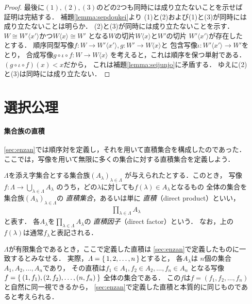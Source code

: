 \begin{proof}
    最後に$(1),(2),(3)$のどの2つも同時には成り立たないことを示せば証明は完結する．
    補題\ref{lemma:sepdoukei}より
    (1)と(2)および(1)と(3)が同時には成り立たないことは明らか．
    (2)と(3)が同時には成り立たないことを示す．
    $W \cong W' \langle x' \rangle$かつ$W \langle x \rangle \cong W'$
    となる$W$の切片$W \langle x \rangle$と$W'$の切片
    $W' \langle x' \rangle$が存在したとする．
    順序同型写像$f:W \longrightarrow W' \langle x' \rangle,
    g : W' \longrightarrow W \langle x \rangle$と
    包含写像$\iota : W' \langle x' \rangle \longrightarrow W'$をとり，
    合成写像$g \circ \iota \circ f : W \longrightarrow W \langle x \rangle$
    を考えると，これは順序を保つ単射である．
    $(g \circ \iota \circ f) (x) < x$だから，
    これは補題\ref{lemma:seijunjo}に矛盾する．
    ゆえに(2)と(3)は同時には成り立たない．
  \end{proof}

  \section{選択公理}

 \paragraph{集合族の直積}
  \ref{sec:enzan}では順序対を定義し，それを用いて直積集合を構成したのであった．
  ここでは，写像を用いて無限に多くの集合に対する直積集合を定義しよう．

  $\varLambda$を添え字集合とする集合族$(A_{\lambda})_{\lambda \in \varLambda}$
  が与えられたとする．このとき，
  写像$f: \varLambda \longrightarrow \bigcup_{\lambda \in \varLambda} A_{\lambda}$
  のうち，どの$\lambda$に対しても$f( \lambda ) \in A_{\lambda}$となるもの
  全体の集合を集合族$(A_{\lambda})_{\lambda \in \varLambda}$の
  \emph{直積集合}，あるいは単に \emph{直積}（direct product）といい，
  \begin{align}
    \prod_{\lambda \in \varLambda} A_{\lambda} 
    \label{eq:prodipan}
  \end{align}
  と表す．
  各$A_{\lambda}$を$\prod_{\lambda \in \varLambda} A_{\lambda}$の
  \emph{直積因子}（direct factor）という．
  なお，上の$f(\lambda)$は通常$f_{\lambda}$と表記される．
  
  $\varLambda$が有限集合であるとき，ここで定義した直積は
  \ref{sec:enzan}で定義したものに一致するとみなせる．
  実際，$\varLambda = \set{ 1,2, \ldots , n}$とすると，
  各$A_{\lambda}$は
  $n$個の集合$A_1 , A_2 , \ldots ,A_n$であり，
  その直積は$f_1 \in A_1 , f_2 \in A_2 , \ldots , f_n \in A_n$
  となる写像$f=\Set{ (1,f_1) , (2,f_2) , \ldots , (n,f_n)}$
  全体の集合である．
  この$f$は$f= (f_1 , f_2 , \ldots , f_n)$と自然に同一視できるから，
  \ref{sec:enzan}で定義した直積と本質的に同じものであると考えられる．

